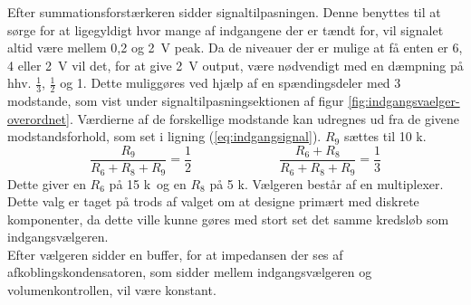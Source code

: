 Efter summationsforstærkeren sidder signaltilpasningen. Denne benyttes til at sørge for at ligegyldigt hvor mange af indgangene der er tændt for, vil signalet altid være mellem 0,2 og 2~V peak. Da de niveauer der er mulige at få enten er 6, 4 eller 2~V vil det, for at give 2~V output, være nødvendigt med en dæmpning på hhv. $\frac{1}{3}$, $\frac{1}{2}$ og 1. Dette muliggøres ved hjælp af en spændingsdeler med 3 modstande, som vist under signaltilpasningsektionen af figur \ref{fig:indgangsvaelger-overordnet}. Værdierne af de forskellige modstande kan udregnes ud fra de givene modstandsforhold, som set i ligning (\ref{eq:indgangsignal}). $R_9$ sættes til 10 k\ohm.
\begin{equation}
\label{eq:indgangsignal}
\frac{R_9}{R_6+R_8+R_9}=\frac{1}{2} \;\;\;\;\;\;\;\;\;\;\;\;~~~~~~~~~~~~~~~~
\frac{R_6+R_8}{R_6+R_8+R_9}=\frac{1}{3}
\end{equation}
Dette giver en $R_6$ på 15 k\ohm~og en $R_8$ på 5 k\ohm.
Vælgeren består af en multiplexer. Dette valg er taget på trods af valget om at designe primært med diskrete komponenter, da dette ville kunne gøres med stort set det samme kredsløb som indgangsvælgeren. \\Efter vælgeren sidder en buffer, for at impedansen der ses af afkoblingskondensatoren, som sidder mellem indgangsvælgeren og volumenkontrollen, vil være konstant.